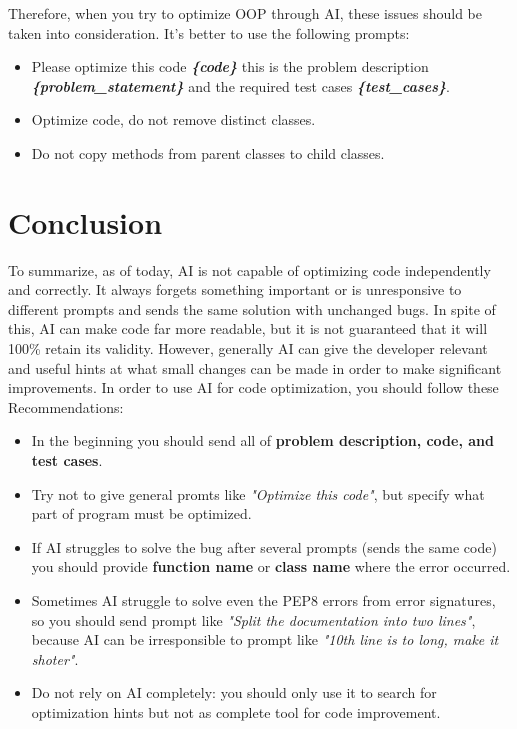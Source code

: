 \documentclass[12pt]{report}
\begin{document}
		Therefore, when you try to optimize OOP through AI, these issues should be taken
		into consideration. It’s better to use the following prompts:

		\begin{itemize}
			\item Please optimize this code \textbf{\textit{\{code\}}} this is the problem description
			\textbf{\textit{\{problem\_statement\}}} and the required test cases \textbf{\textit{\{test\_cases\}}}.
			\item Optimize code, do not remove distinct classes.
			\item Do not copy methods from parent classes to child classes.
	\end{itemize}

	\section{Conclusion}
		To summarize, as of today, AI is not capable of optimizing code independently and correctly. It always forgets something important or is unresponsive to
		different prompts and sends the same solution with unchanged bugs. In spite of
		this, AI can make code far more readable, but it is not guaranteed that it
		will 100\% retain its validity. However, generally AI can give the developer relevant and useful hints at what small changes can be made in order to make significant improvements.
		In order to use AI for code optimization, you should follow these
		Recommendations:


		\begin{itemize}
			\item In the beginning you should send all of \textbf{problem description, code, and test cases}.
			\item Try not to give general promts like \textit{"Optimize this code"}, but specify what part of program
			must be optimized.
			\item If AI struggles to solve the bug after several prompts (sends the same code) you should provide \textbf{function name} or \textbf{class name} where the error occurred.
			\item Sometimes AI struggle to solve even the PEP8 errors from error signatures, so you should send prompt like \textit{"Split the documentation into two lines"}, because AI can be irresponsible to prompt like \textit{"10th line is to long, make it shoter"}.
			\item Do not rely on AI completely: you should only use it to search for optimization hints but not as complete tool for code improvement.
		\end{itemize}
\end{document}

